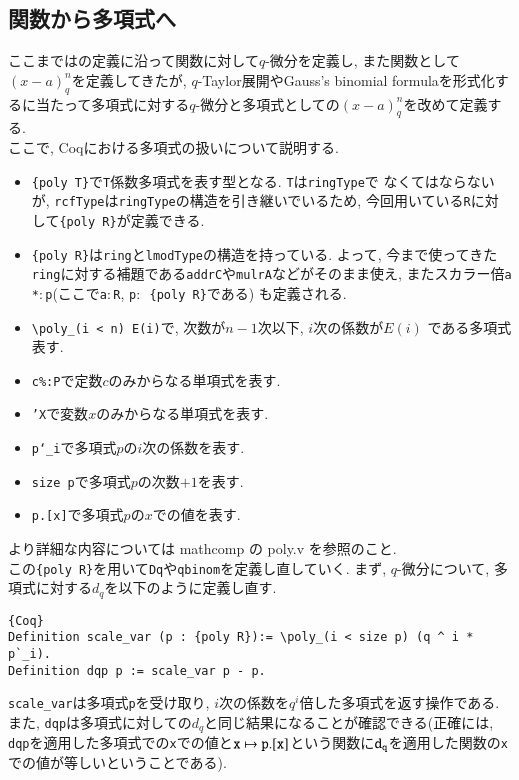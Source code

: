\documentclass[11pt]{jarticle}
\theoremstyle{mystyle}
\newcommand{\0}{\textbf{0}}
\newcommand{\1}{\textbf{1}}
\newcommand{\2}{\textbf{2}}
\begin{document}
\subsection{関数から多項式へ} \label{sssec poly}
ここまでは\cite{Kac}の定義に沿って関数に対して$q$-微分を定義し, また関数として
$(x - a)^n_q$を定義してきたが, $q$-Taylor展開やGauss's binomial formulaを形式化するに当たって多項式に対する$q$-微分と多項式としての$(x - a)^n_q$を改めて定義する. \\
ここで, Coqにおける多項式の扱いについて説明する. 
\begin{itemize}
  \item {\tt \{poly T\}}で{\tt T}係数多項式を表す型となる. {\tt T}は{\tt ringType}で
    なくてはならないが, {\tt rcfType}は{\tt ringType}の構造を引き継いでいるため, 
    今回用いている{\tt R}に対して{\tt \{poly R\}}が定義できる. 
  \item {\tt \{poly R\}}は{\tt ring}と{\tt lmodType}の構造を持っている. よって, 今まで使ってきた
    {\tt ring}に対する補題である{\tt addrC}や{\tt mulrA}などがそのまま使え, 
    またスカラー倍{\tt a *$\colon$p}(ここで{\tt a$\colon$R}, {\tt p$\colon$ \{poly R\}}である)
    も定義される. 
  \item {\tt \textbackslash poly\_(i < n) E(i)}で, 次数が$n - 1$次以下, $i$次の係数が$E(i)$
    である多項式表す. 
  \item {\tt c\%:P}で定数$c$のみからなる単項式を表す. 
  \item {\tt 'X}で変数$x$のみからなる単項式を表す. 
  \item {\tt p`\_i}で多項式$p$の$i$次の係数を表す. 
  \item {\tt size p}で多項式$p$の次数$+1$を表す.
  \item {\tt p.[x]}で多項式$p$の$x$での値を表す. 
\end{itemize}
より詳細な内容については mathcomp の poly.v \cite{coq poly}を参照のこと. \\
この{\tt \{poly R\}}を用いて{\tt Dq}や{\tt qbinom}を定義し直していく. 
まず, $q$-微分について, 多項式に対する$d_q$を以下のように定義し直す. 
\begin{lstlisting}{Coq}
Definition scale_var (p : {poly R}):= \poly_(i < size p) (q ^ i * p`_i).
Definition dqp p := scale_var p - p. \end{lstlisting}
{\tt scale\_var}は多項式{\tt p}を受け取り, $i$次の係数を$q^i$倍した多項式を返す操作である. また, {\tt dqp}は多項式に対しての$d_q$と同じ結果になることが確認できる(正確には, {\tt dqp}を適用した多項式での{\tt x}での値と${\tt x} \mapsto {\tt p.[x]}$という関数に${\tt d}_{\tt q}$を適用した関数の{\tt x}での値が等しいということである). 
\end{document}
